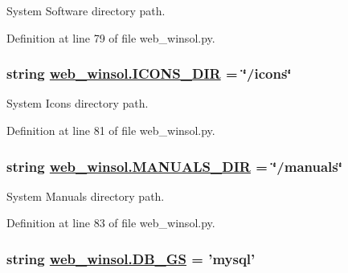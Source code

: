 System Software directory path. 



Definition at line 79 of file web\_\-winsol.py.\hypertarget{namespaceweb__winsol_f59bb54f7c61a1aed497363d9c6b1876}{
\subsubsection[ICONS\_\-DIR]{\setlength{\rightskip}{0pt plus 5cm}string \hyperlink{namespaceweb__winsol_f59bb54f7c61a1aed497363d9c6b1876}{web\_\-winsol.ICONS\_\-DIR} = \char`\"{}/icons\char`\"{}}}
\label{namespaceweb__winsol_f59bb54f7c61a1aed497363d9c6b1876}


System Icons directory path. 



Definition at line 81 of file web\_\-winsol.py.\hypertarget{namespaceweb__winsol_0c2448b521ee3e0d5fb865773d1e9d52}{
\subsubsection[MANUALS\_\-DIR]{\setlength{\rightskip}{0pt plus 5cm}string \hyperlink{namespaceweb__winsol_0c2448b521ee3e0d5fb865773d1e9d52}{web\_\-winsol.MANUALS\_\-DIR} = \char`\"{}/manuals\char`\"{}}}
\label{namespaceweb__winsol_0c2448b521ee3e0d5fb865773d1e9d52}


System Manuals directory path. 



Definition at line 83 of file web\_\-winsol.py.\hypertarget{namespaceweb__winsol_28cba69d5286b28f6fce9d69445fe806}{
\subsubsection[DB\_\-GS]{\setlength{\rightskip}{0pt plus 5cm}string \hyperlink{namespaceweb__winsol_28cba69d5286b28f6fce9d69445fe806}{web\_\-winsol.DB\_\-GS} = 'mysql'}}
\label{namespaceweb__winsol_28cba69d5286b28f6fce9d69445fe806}



